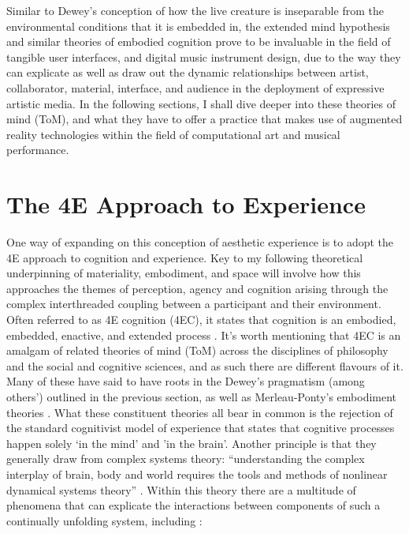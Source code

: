 Similar to Dewey’s conception of how the live creature is inseparable from the environmental conditions that it is embedded in, the extended mind hypothesis and similar theories of embodied cognition prove to be invaluable in the field of tangible user interfaces, and digital music instrument design, due to the way they can explicate as well as draw out the dynamic relationships between artist, collaborator, material, interface, and audience in the deployment of expressive artistic media. In the following sections, I shall dive deeper into these theories of mind (ToM), and what they have to offer a practice that makes use of augmented reality technologies within the field of computational art and musical performance.



\section{The 4E Approach to Experience}\label{sec: theory-4e}
One way of expanding on this conception of aesthetic experience is to adopt the 4E approach to cognition and experience. Key to my following theoretical underpinning of materiality, embodiment, and space will involve how this approaches the themes of perception, agency and cognition arising through the complex interthreaded coupling between a participant and their environment. Often referred to as 4E cognition (4EC), it states that cognition is an embodied, embedded, enactive, and extended process \citep{gallagher2017}. It’s worth mentioning that 4EC is an amalgam of related theories of mind (ToM) across the disciplines of philosophy and the social and cognitive sciences, and as such there are different flavours of it. Many of these have said to have roots in the Dewey’s pragmatism (among others’) outlined in the previous section, as well as Merleau-Ponty’s embodiment theories \citep{zavota2016}. What these constituent theories all bear in common is the rejection of the standard cognitivist model of experience that states that cognitive processes happen solely ‘in the mind’ and ’in the brain’. Another principle is that they generally draw from complex systems theory: “understanding the complex interplay of brain, body and world requires the tools and methods of nonlinear dynamical systems theory” \citep{clark1999}. Within this theory there are a multitude of phenomena that can explicate the interactions between components of such a continually unfolding system, including \citep{dedomenico2019}:
